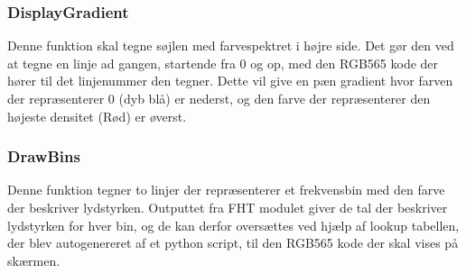 \subsubsection{DisplayGradient}
Denne funktion skal tegne søjlen med farvespektret i højre side. Det gør den ved at tegne en linje ad gangen, startende fra 0 og op, med den RGB565 kode der hører til det linjenummer den tegner.
Dette vil give en pæn gradient hvor farven der repræsenterer 0 (dyb blå) er nederst, og den farve der repræsenterer den højeste densitet (Rød) er øverst.

\subsubsection{DrawBins}
Denne funktion tegner to linjer der repræsenterer et frekvensbin med den farve der beskriver lydstyrken. Outputtet fra FHT modulet giver de tal der beskriver lydstyrken for hver bin, og de kan derfor oversættes ved hjælp af lookup tabellen, der blev autogenereret af et python script, til den RGB565 kode der skal vises på skærmen.

